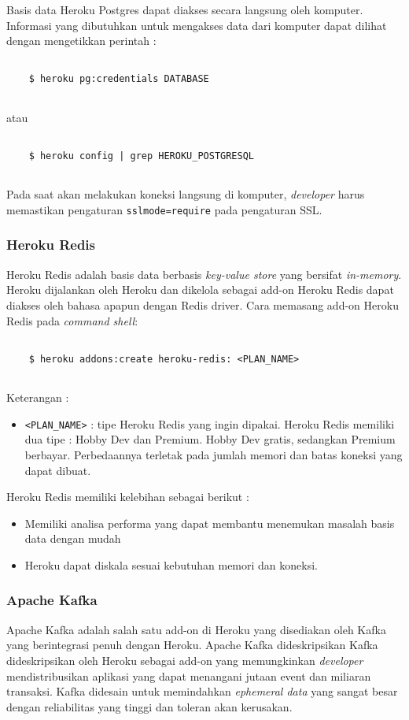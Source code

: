 Basis data Heroku Postgres dapat diakses secara langsung oleh komputer. Informasi yang dibutuhkan untuk mengakses data dari komputer dapat dilihat dengan mengetikkan perintah :
\begin{lstlisting}

	$ heroku pg:credentials DATABASE
	
\end{lstlisting}
atau
\begin{lstlisting}

	$ heroku config | grep HEROKU_POSTGRESQL
	
\end{lstlisting}
Pada saat akan melakukan koneksi langsung di komputer, \textit{developer} harus memastikan pengaturan \texttt{sslmode=require} pada pengaturan SSL.

\subsubsection{Heroku Redis}
Heroku Redis adalah basis data berbasis \textit{key-value store} yang bersifat \textit{in-memory}. Heroku dijalankan oleh Heroku dan dikelola sebagai add-on Heroku Redis dapat diakses oleh bahasa apapun dengan Redis driver. Cara memasang add-on Heroku Redis pada \textit{command shell}:
\begin{lstlisting}
	
	$ heroku addons:create heroku-redis: <PLAN_NAME>
	
\end{lstlisting}
Keterangan :
\begin{itemize}
\item \texttt{<PLAN\_NAME>} : tipe Heroku Redis yang ingin dipakai. Heroku Redis memiliki dua tipe : Hobby Dev dan Premium. Hobby Dev gratis, sedangkan Premium berbayar. Perbedaannya terletak pada jumlah memori dan batas koneksi yang dapat dibuat.
\end{itemize}

Heroku Redis memiliki kelebihan sebagai berikut :
\begin{itemize}
\item Memiliki analisa performa yang dapat membantu menemukan masalah basis data dengan mudah
\item Heroku dapat diskala sesuai kebutuhan memori dan koneksi.
\end{itemize}

\subsubsection{Apache Kafka}
Apache Kafka adalah salah satu add-on di Heroku yang disediakan oleh Kafka yang berintegrasi penuh dengan Heroku. Apache Kafka dideskripsikan Kafka dideskripsikan oleh Heroku sebagai add-on yang memungkinkan \textit{developer} mendistribusikan aplikasi yang dapat menangani jutaan event dan miliaran transaksi. Kafka didesain untuk memindahkan \textit{ephemeral data} yang sangat besar dengan reliabilitas yang tinggi dan toleran akan kerusakan.

